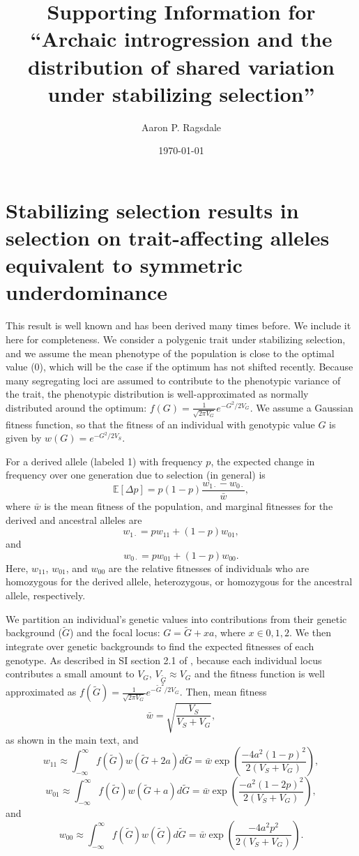 \documentclass[]{article}
\title{Supporting Information for\\
``Archaic introgression and the distribution
of shared variation under stabilizing selection''}
\author[]{Aaron P. Ragsdale}
\affil[]{Department of Integrative Biology, University of Wisconsin--Madison, WI, USA}
\date{\today}
\newcommand{\E}{\mathbb{E}}
\begin{document}
\maketitle

\renewcommand{\thesection}{S\arabic{section}}
\renewcommand{\thetable}{S\arabic{table}}
\renewcommand{\thefigure}{S\arabic{figure}}

\section{Stabilizing selection results in selection on trait-affecting alleles
equivalent to symmetric underdominance} \label{sec:underdominance}

This result is well known and has been derived many times before. We include it
here for completeness. We consider a polygenic trait under stabilizing
selection, and we assume the mean phenotype of the population is close to the
optimal value (0), which will be the case if the optimum has not shifted
recently. Because many segregating loci are assumed to contribute to the
phenotypic variance of the trait, the phenotypic distribution is
well-approximated as normally distributed around the optimum:
\(f(G)=\frac{1}{\sqrt{2\pi V_G}} e^{-G^2/2V_G}\). We assume a Gaussian fitness
function, so that the fitness of an individual with genotypic value $G$ is
given by \(w(G)=e^{-G^2/2V_S}\).

For a derived allele (labeled 1) with frequency $p$, the expected change in
frequency over one generation due to selection (in general) is
\[\E[\Delta p]=p(1-p)\frac{w_{1\cdot}-w_{0\cdot}}{\bar{w}},\]
where \(\bar{w}\) is the mean fitness of the population, and marginal fitnesses
for the derived and ancestral alleles are
\[w_{1\cdot}=p w_{11} + (1-p)w_{01},\]
and
\[w_{0\cdot}=p w_{01} + (1-p)w_{00}.\]
Here, $w_{11}$, $w_{01}$, and $w_{00}$ are the relative fitnesses of
individuals who are homozygous for the derived allele, heterozygous, or
homozygous for the ancestral allele, respectively.

We partition an individual's genetic values into contributions from their
genetic background ($\tilde{G}$) and the focal locus: $G=\tilde{G}+xa$, where
$x\in{0,1,2}$.  We then integrate over genetic backgrounds to find the expected
fitnesses of each genotype. As described in SI section 2.1 of
\citet{simons2018population}, because each individual locus contributes a small
amount to $V_G$, $V_{\tilde{G}}\approx V_G$ and the fitness function is well
approximated as \(f(\tilde{G})=\frac{1}{\sqrt{2\pi
V_G}}e^{-\tilde{G}^2/2V_G}\). Then, mean fitness
\[
    \bar{w} = \sqrt{\frac{V_S}{V_S+V_G}},
\]
as shown in the main text, and
\[ 
    w_{11} \approx \int_{-\infty}^\infty f(\tilde{G}) w(\tilde{G} + 2a) d\tilde{G}
    = \bar{w}\exp{\left(\frac{-4a^2(1-p)^2}{2(V_S+V_G)}\right)},
\]
\[
    w_{01} \approx \int_{-\infty}^\infty f(\tilde{G}) w(\tilde{G} + a) d\tilde{G}
    = \bar{w}\exp{\left(\frac{-a^2(1-2p)^2}{2(V_S+V_G)}\right)},
\]
and
\[
    w_{00} \approx \int_{-\infty}^\infty f(\tilde{G}) w(\tilde{G}) d\tilde{G}
    = \bar{w}\exp{\left(\frac{-4a^2p^2}{2(V_S+V_G)}\right)}.
\]
\end{document}
